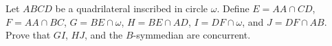 Let $ABCD$ be a quadrilateral inscribed in circle $\omega$. Define $E = AA \cap CD$, $F = AA \cap BC$, $G = BE \cap \omega$, $H = BE \cap AD$, $I = DF \cap \omega$, and $J = DF \cap AB$. Prove that $GI$, $HJ$, and the $B$-symmedian are concurrent.

